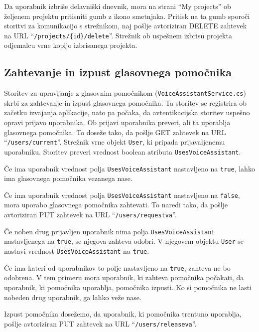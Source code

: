 \documentclass[a4paper, 12pt]{book}
\begin{document}
Da uporabnik izbriše delavniški dnevnik, mora na strani \enquote{My projects} ob željenem projektu pritisniti gumb z ikono smetnjaka.
Pritisk na ta gumb sporoči storitvi za komunikacijo s strežnikom, naj pošlje avtoriziran DELETE zahtevek na URL \enquote{\texttt{/projects/\{id\}/delete}}.
Strežnik ob uspešnem izbrisu projekta odjemalcu vrne kopijo izbrisanega projekta.

\subsection{Zahtevanje in izpust glasovnega pomočnika}
Storitev za upravljanje z glasovnim pomočnikom (\texttt{VoiceAssistantService.cs}) skrbi za zahtevanje in izpust glasovnega pomočnika.
Ta storitev se registrira ob začetku izvajanja aplikacije, nato pa počaka, da avtentikacijska storitev uspešno opravi prijavo uporabnika.
Ob prijavi uporabnika preveri, ali ta uporablja glasovnega pomočnika.
To doseže tako, da pošlje GET zahtevek na URL \enquote{\texttt{/users/current}}.
Strežnik vrne objekt \texttt{User}, ki pripada prijavaljenemu uporabniku.
Storitev preveri vrednost boolean atributa \texttt{UsesVoiceAssistant}.

Če ima uporabnik vrednost polja \texttt{UsesVoiceAssistant} nastavljeno na \texttt{true}, lahko ima glasovnega pomočnika vezanega nase.

Če ima uporabnik vrednost polja \texttt{UsesVoiceAssistant} nastavljeno na \texttt{false}, mora uporabo glasovnega pomočnika zahtevati.
To naredi tako, da pošlje avtoriziran PUT zahtevek na URL \enquote{\texttt{/users/requestva}}.

Če noben drug prijavljen uporabnik nima polja \texttt{UsesVoiceAssistant} nastavljenega na \texttt{true}, se njegova zahteva odobri.
V njegovem objektu \texttt{User} se nastavi vrednost \texttt{UsesVoiceAssistant} na \texttt{true}.

Če ima kateri od uporabnikov to polje nastavljeno na \texttt{true}, zahteva ne bo odobrena.
V tem primeru mora uporabnik, ki zahteva pomočnika počakati, da uporabnik, ki pomočnika uporablja, pomočnika izpusti.
Ko si pomočnika ne lasti nobeden drug uporabnik, ga lahko veže nase.

Izpust pomočnika dosežemo, da uporabnik, ki pomočnika trentuno uporablja, pošlje avtoriziran PUT zahtevek na URL \enquote{\texttt{/users/releaseva}}.
\end{document}
